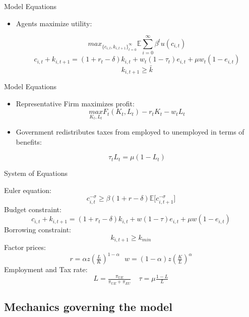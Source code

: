 \documentclass{beamer}
\begin{document}
\begin{frame}{Model Equations}
	\begin{itemize}
	
	\item {
	Agents maximize utility:
	}

\[ 
max_{\{{ c_{i,t}, k_{i,t+1} }\}_{t = 0}^{\infty}} {\mathbb{E}} \sum_{i=0}^{\infty} \beta^{t}  u(c_{i,t}) 
\]
 \[ 
 c_{i,t} + k_{i,t+1} = (1 + r_{t} - \delta) k_{i,t} + w_{t} (1 - \tau_{t})  e_{i,t} + \mu w_{t} (1 - e_{i,t})
 \]
  \[
  k_{i,t + 1} \geq \bar{k}
	\]


	\end{itemize}

\end{frame}

\begin{frame}{Model Equations}
	\begin{itemize}
	
	\item {
	Representative Firm maximizes profit:
	}
\[ 
\underset{K_{t},L_{t}}{max} F_{t}(K_{t},L_{t}) -r_{t}K_{t} - w_{t}L_{t}
\]

	\item {
	Government redistributes taxes from employed to unemployed in terms of benefits:
	}

\[ 
\tau_{t}L_{t} = \mu(1-L_{t})
\]

	\end{itemize}

\end{frame}


\begin{frame}{System of Equations}
	
Euler equation:
\[ 
c_{i,t}^{- \sigma} \geq \beta (1+r -\delta){\mathbb{E}[c_{i,t+1}^{- \sigma}}]
\]
Budget constraint:
 \[ 
 c_{i,t} + k_{i,t+1} = (1 + r_{t} - \delta) k_{i,t} + w (1 - \tau)  e_{i,t} + \mu w (1 - e_{i,t})
 \]
Borrowing constraint:
  \[
  k_{i,t + 1} \geq k_{min}
	\]
Factor prices:
\[
r = \alpha z (\tfrac{L}{K})^{1-\alpha} \ \ \ w = (1-\alpha)z (\tfrac{K}{L})^{\alpha}
\]
Employment and Tax rate: 
\[
L = \tfrac{\pi_{UE}}{\pi_{UE}+\pi_{EU}} \ \ \ \ \  \tau = \mu \tfrac{1-L}{L}
\]

\end{frame}

\subsection{Mechanics governing the model}
\end{document}
